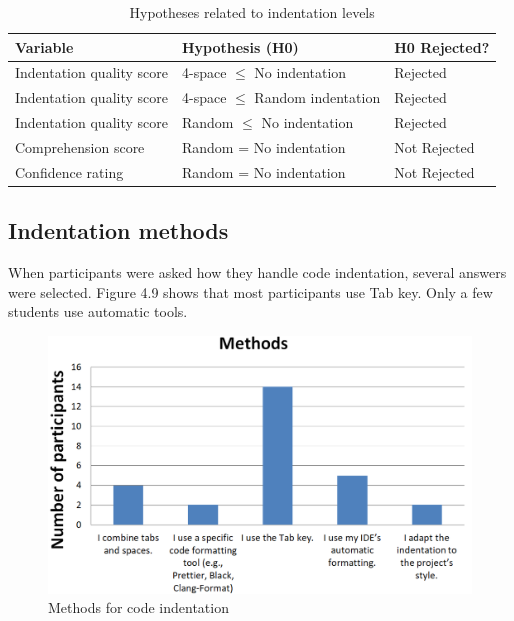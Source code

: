 \begin{table}[ht]
\centering
\small
\begin{tabular}{|p{5cm}|p{6cm}|p{2.5cm}|}
\hline
\rule{0pt}{1.2em}\textbf{Variable} & \textbf{Hypothesis (H0)} & \textbf{H0 Rejected?} \\[0.5em]
\hline
\rule{0pt}{1.2em}Indentation quality score & 4-space $\leq$ No indentation & Rejected \\[0.5em]
\hline
\rule{0pt}{1.2em}Indentation quality score & 4-space $\leq$ Random indentation & Rejected \\[0.5em]
\hline
\rule{0pt}{1.2em}Indentation quality score & Random $\leq$ No indentation & Rejected \\[0.5em]
\hline
\rule{0pt}{1.2em}Comprehension score & Random = No indentation & Not Rejected \\[0.5em]
\hline
\rule{0pt}{1.2em}Confidence rating & Random = No indentation & Not Rejected \\[0.5em]
\hline
\end{tabular}
\caption{Hypotheses related to indentation levels}
\end{table}


\subsection{Indentation methods}
When participants were asked how they handle code indentation, several answers were selected. Figure 4.9 shows that most participants use Tab key. Only a few students use automatic tools.  

\begin{figure} [H]
  \centering
  \includegraphics[scale=0.8]{figures/inM.png}
  \caption{Methods for code indentation}
  \label{fig:AnhangsChor}
\end{figure}



